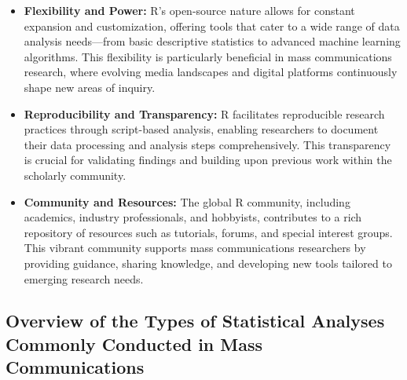\documentclass[
]{book}
\begin{document}
\begin{itemize}
\item
  \textbf{Flexibility and Power:} R's open-source nature allows for constant expansion and customization, offering tools that cater to a wide range of data analysis needs---from basic descriptive statistics to advanced machine learning algorithms. This flexibility is particularly beneficial in mass communications research, where evolving media landscapes and digital platforms continuously shape new areas of inquiry.
\item
  \textbf{Reproducibility and Transparency:} R facilitates reproducible research practices through script-based analysis, enabling researchers to document their data processing and analysis steps comprehensively. This transparency is crucial for validating findings and building upon previous work within the scholarly community.
\item
  \textbf{Community and Resources:} The global R community, including academics, industry professionals, and hobbyists, contributes to a rich repository of resources such as tutorials, forums, and special interest groups. This vibrant community supports mass communications researchers by providing guidance, sharing knowledge, and developing new tools tailored to emerging research needs.
\end{itemize}

\subsection*{Overview of the Types of Statistical Analyses Commonly Conducted in Mass Communications}\label{overview-of-the-types-of-statistical-analyses-commonly-conducted-in-mass-communications}
\end{document}
